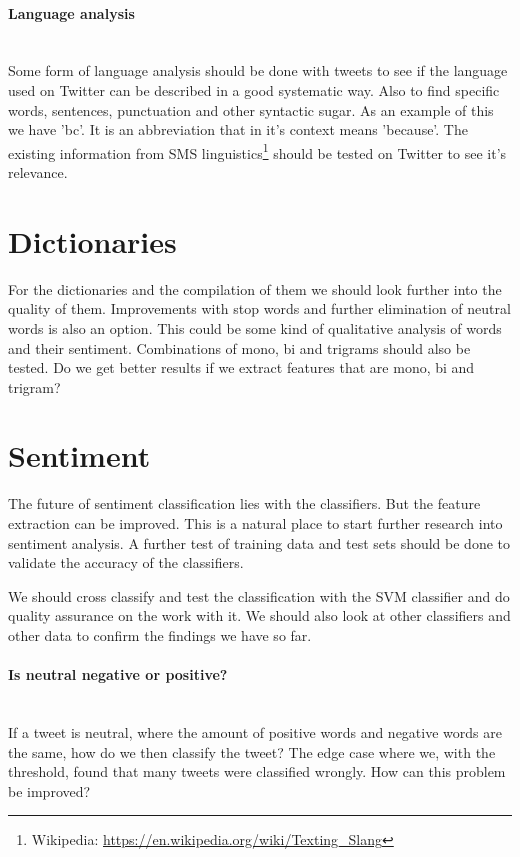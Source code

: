 \paragraph{Language analysis}
\hspace{0pt}\\
Some form of language analysis should be done with tweets to see if the
language used on Twitter can be described in a good systematic way. Also to
find specific words, sentences, punctuation and other syntactic sugar. 
As an example of this we have 'bc'. It is an abbreviation that in it's
context means 'because'. The existing information from SMS
linguistics\footnote{Wikipedia:
\url{https://en.wikipedia.org/wiki/Texting_Slang}} should be
tested on Twitter to see it's relevance. 
%

\section{Dictionaries}\label{future_work:dictionaries}
For the dictionaries and the compilation of them we should look further into
the quality of them. Improvements with stop words and further elimination of
neutral words is also an option. This could be some kind of qualitative
analysis of words and their sentiment. Combinations of mono, bi and trigrams
should also be tested. Do we get better results if we extract features that are
mono, bi and trigram? 
%

\section{Sentiment}\label{future_work:sentiment}
The future of sentiment classification lies with the classifiers. But the
feature extraction can be improved. This is a natural place to start further
research into sentiment analysis. A further test of training data and test sets
should be done to validate the accuracy of the classifiers.   

We should cross classify and test the classification with the SVM classifier
and do quality assurance on the work with it. We should also look at other
classifiers and other data to confirm the findings we have so far.
 
\paragraph{Is neutral negative or positive?}
\hspace{0pt}\\
If a tweet is neutral, where the amount of positive words and
negative words are the same, how do we then classify the tweet? The edge case
where we, with the threshold, found that many tweets were classified wrongly.
How can this problem be improved?

